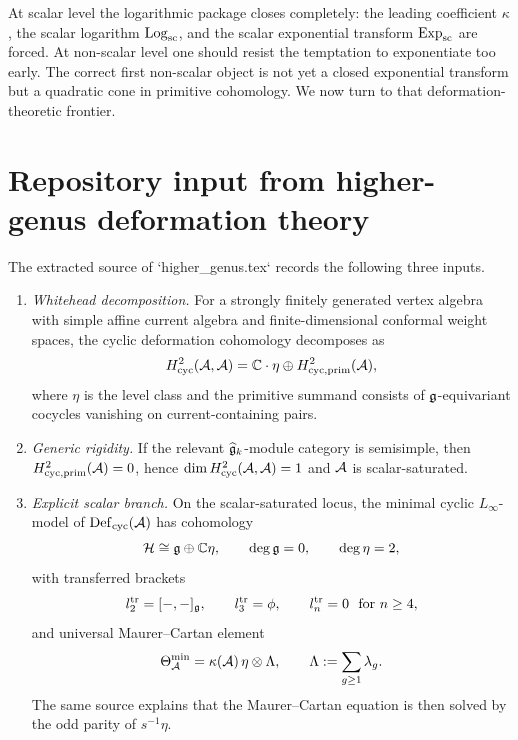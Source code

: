 \begin{remark}
\label{rem:what-has-been-integrated}
At scalar level the logarithmic package closes completely: the leading
coefficient $\kappa$, the scalar logarithm $\mathrm{Log}_{\mathrm{sc}}$, and the scalar exponential
transform $\mathrm{Exp}_{\mathrm{sc}}$ are forced.  At non-scalar level one should resist the
temptation to exponentiate too early.  The correct first non-scalar object is
not yet a closed exponential transform but a quadratic cone in primitive
cohomology.  We now turn to that deformation-theoretic frontier.
\end{remark}

\section{Repository input from higher-genus deformation theory}
\label{sec:repository-higher-genus-input}

\begin{framework}
\label{frw:whitehead-generic-rigidity}
The extracted source of `higher\_genus.tex` records the following three inputs.
\begin{enumerate}[label=\textup{(\arabic*)}]
\item \emph{Whitehead decomposition.}  For a strongly finitely generated vertex
algebra with simple affine current algebra and finite-dimensional conformal
weight spaces, the cyclic deformation cohomology decomposes as
\[
H^2_{\mathrm{cyc}}(\mathcal{A},\mathcal{A})=\mathbb{C}\cdot \eta\oplus H^2_{\mathrm{cyc,prim}}(\mathcal{A}),
\]
where $\eta$ is the level class and the primitive summand consists of
$\mathfrak{g}$-equivariant cocycles vanishing on current-containing pairs.
\item \emph{Generic rigidity.}  If the relevant $\widehat{\mathfrak{g}}_k$-module category is
semisimple, then $H^2_{\mathrm{cyc,prim}}(\mathcal{A})=0$, hence
$\dim H^2_{\mathrm{cyc}}(\mathcal{A},\mathcal{A})=1$ and $\mathcal{A}$ is scalar-saturated.
\item \emph{Explicit scalar branch.}  On the scalar-saturated locus, the minimal
cyclic $L_\infty$-model of $\mathrm{Def}_{\mathrm{cyc}}(\mathcal{A})$ has cohomology
\[
\mathcal{H}\cong \mathfrak{g}\oplus \mathbb{C}\eta,
\qquad \deg \mathfrak{g}=0,
\qquad \deg\eta=2,
\]
with transferred brackets
\[
l_2^{\mathrm{tr}}=[-,-]_{\mathfrak{g}},
\qquad
l_3^{\mathrm{tr}}=\phi,
\qquad
l_n^{\mathrm{tr}}=0\ \text{ for }n\ge 4,
\]
and universal Maurer--Cartan element
\[
\Theta_{\mathcal{A}}^{\min}=\kappa(\mathcal{A})\,\eta\otimes\Lambda,
\qquad
\Lambda:=\sum_{g\ge 1}\lambda_g.
\]
The same source explains that the Maurer--Cartan equation is then solved by the
odd parity of $s^{-1}\eta$.
\end{enumerate}
\end{framework}

